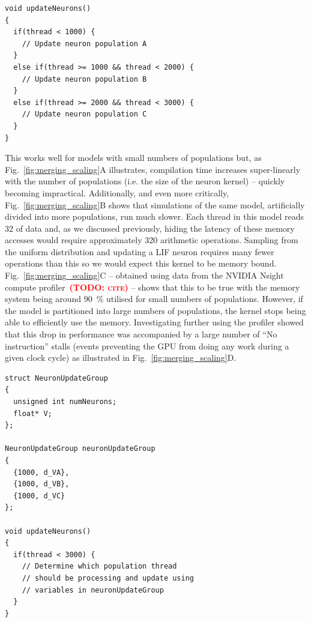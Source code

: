 \documentclass[9pt,twocolumn,twoside,lineno]{pnas-new}
\newcommand{\todo}[1]{\textbf{\textsc{\textcolor{red}{(TODO: #1)}}}}
\begin{document}
\begin{lstlisting}
void updateNeurons()
{
  if(thread < 1000) {
    // Update neuron population A
  }
  else if(thread >= 1000 && thread < 2000) {
    // Update neuron population B
  }
  else if(thread >= 2000 && thread < 3000) {
    // Update neuron population C
  }
}

\end{lstlisting}

This works well for models with small numbers of populations but, as Fig.~\ref{fig:merging_scaling}A illustrates, compilation time increases super-linearly with the number of populations (i.e. the size of the neuron kernel) -- quickly becoming impractical.
Additionally, and even more critically, Fig.~\ref{fig:merging_scaling}B shows that simulations of the same model, artificially divided into more populations, run much slower.
Each thread in this model reads \SI{32}{\byte} of data and, as we discussed previously, hiding the latency of these memory accesses would require approximately 320 arithmetic operations.
Sampling from the uniform distribution and updating a LIF neuron requires many fewer operations than this so we would expect this kernel to be memory bound.
Fig.~\ref{fig:merging_scaling}C -- obtained using data from the NVIDIA Nsight compute profiler~\todo{cite} -- shows that this to be true with the memory system being around \SI{90}{\percent} utilised for small numbers of populations.
However, if the model is partitioned into large numbers of populations, the kernel stops being able to efficiently use the memory.
Investigating further using the profiler showed that this drop in performance was accompanied by a large number of ``No instruction'' stalls (events preventing the GPU from doing any work during a given clock cycle) as illustrated in Fig.~\ref{fig:merging_scaling}D.

\begin{lstlisting}
struct NeuronUpdateGroup
{
  unsigned int numNeurons;
  float* V; 
};

NeuronUpdateGroup neuronUpdateGroup
{
  {1000, d_VA},
  {1000, d_VB},
  {1000, d_VC}
};

void updateNeurons()
{
  if(thread < 3000) {
    // Determine which population thread
    // should be processing and update using 
    // variables in neuronUpdateGroup
  }
}
\end{lstlisting}
\end{document}
